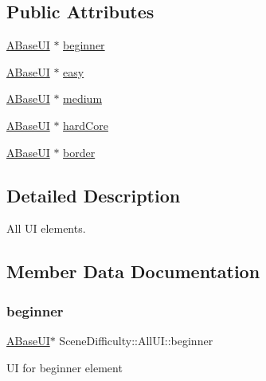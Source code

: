 \subsection*{Public Attributes}
\begin{DoxyCompactItemize}
\item 
\hyperlink{class_a_base_u_i}{A\+Base\+UI} $\ast$ \hyperlink{struct_scene_difficulty_1_1_all_u_i_a7b47580f2e606f79f2d117c7d348aad7}{beginner}
\item 
\hyperlink{class_a_base_u_i}{A\+Base\+UI} $\ast$ \hyperlink{struct_scene_difficulty_1_1_all_u_i_acb9d7c8cb4617cfc353f475bec54b19e}{easy}
\item 
\hyperlink{class_a_base_u_i}{A\+Base\+UI} $\ast$ \hyperlink{struct_scene_difficulty_1_1_all_u_i_a19bd705042ffd4a8d8bddf7aa4959ae4}{medium}
\item 
\hyperlink{class_a_base_u_i}{A\+Base\+UI} $\ast$ \hyperlink{struct_scene_difficulty_1_1_all_u_i_a0d3c51dfb0a9635f2bc4d76fe707b3a3}{hard\+Core}
\item 
\hyperlink{class_a_base_u_i}{A\+Base\+UI} $\ast$ \hyperlink{struct_scene_difficulty_1_1_all_u_i_a8c0a119bef1acfe64138fd5b9fc9442d}{border}
\end{DoxyCompactItemize}


\subsection{Detailed Description}
All UI elements. 

\subsection{Member Data Documentation}
\mbox{\label{struct_scene_difficulty_1_1_all_u_i_a7b47580f2e606f79f2d117c7d348aad7}} 
\subsubsection{\texorpdfstring{beginner}{beginner}}
{\footnotesize\ttfamily \hyperlink{class_a_base_u_i}{A\+Base\+UI}$\ast$ Scene\+Difficulty\+::\+All\+U\+I\+::beginner}

UI for beginner element \mbox{\label{struct_scene_difficulty_1_1_all_u_i_a8c0a119bef1acfe64138fd5b9fc9442d}} 
